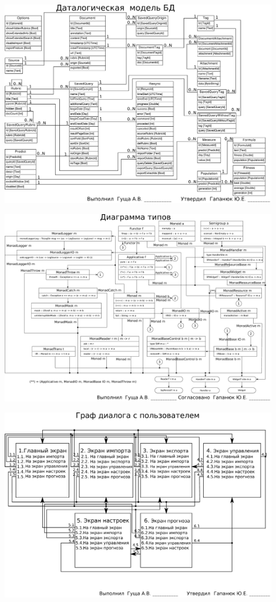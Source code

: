 \documentclass[russian,utf8, a1paper, emptystyle]{eskdgraph}
\begin{document}
\begin{ESKDdrawing}
\includegraphics[width=0.90\textwidth]{lists/list6}
\end{ESKDdrawing}

\begin{ESKDdrawing}
\includegraphics[width=0.90\textwidth]{lists/list7}
\end{ESKDdrawing}

\begin{ESKDdrawing}
\includegraphics[width=0.90\textwidth]{lists/list8}
\end{ESKDdrawing}
\end{document}
